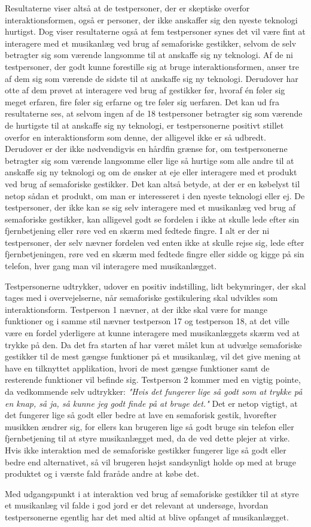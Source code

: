 Resultaterne viser altså at de testpersoner, der er skeptiske overfor interaktionsformen, også er personer, der ikke anskaffer sig den nyeste teknologi hurtigst. Dog viser resultaterne også at fem testpersoner synes det vil være fint at interagere med et musikanlæg ved brug af semaforiske gestikker, selvom de selv betragter sig som værende langsomme til at anskaffe sig ny teknologi. Af de ni testpersoner, der godt kunne forestille sig at bruge interaktionsformen, anser tre af dem sig som værende de sidste til at anskaffe sig ny teknologi. Derudover har otte af dem prøvet at interagere ved brug af gestikker før, hvoraf én føler sig meget erfaren, fire føler sig erfarne og tre føler sig uerfaren. Det kan ud fra resultaterne ses, at selvom ingen af de 18 testpersoner betragter sig som værende de hurtigste til at anskaffe sig ny teknologi, er testpersonerne positivt stillet overfor en interaktionsform som denne, der alligevel ikke er så udbredt. Derudover er der ikke nødvendigvis en hårdfin grænse for, om testpersonerne betragter sig som værende langsomme eller lige så hurtige som alle andre til at anskaffe sig ny teknologi og om de ønsker at eje eller interagere med et produkt ved brug af semaforiske gestikker. Det kan altså betyde, at der er en købelyst til netop sådan et produkt, om man er interesseret i den nyeste teknologi eller ej. De testpersoner, der ikke kan se sig selv interagere med et musikanlæg ved brug af semaforiske gestikker, kan alligevel godt se fordelen i ikke at skulle lede efter sin fjernbetjening eller røre ved en skærm med fedtede fingre. I alt er der ni testpersoner, der selv nævner fordelen ved enten ikke at skulle rejse sig, lede efter fjernbetjeningen, røre ved en skærm med fedtede fingre eller sidde og kigge på sin telefon, hver gang man vil interagere med musikanlægget. \blankline
 
Testpersonerne udtrykker, udover en positiv indstilling, lidt bekymringer, der skal tages med i overvejelserne, når semaforiske gestikulering skal udvikles som interaktionsform. Testperson 1 nævner, at der ikke skal være for mange funktioner og i samme stil nævner testperson 17 og testperson 18, at det ville være en fordel yderligere at kunne interagere med musikanlæggets skærm ved at trykke på den. Da det fra starten af har været målet kun at udvælge semaforiske gestikker til de mest gængse funktioner på et musikanlæg, vil det give mening at have en tilknyttet applikation, hvori de mest gængse funktioner samt de resterende funktioner vil befinde sig. Testperson 2 kommer med en vigtig pointe, da vedkommende selv udtrykker: \textsl{"Hvis det fungerer lige så godt som at trykke på en knap, så ja, så kunne jeg godt finde på at bruge det."} Det er netop vigtigt, at det fungerer lige så godt eller bedre at lave en semaforisk gestik, hvorefter musikken ændrer sig, for ellers kan brugeren lige så godt bruge sin telefon eller fjernbetjening til at styre musikanlægget med, da de ved dette plejer at virke. Hvis ikke interaktion med de semaforiske gestikker fungerer lige så godt eller bedre end alternativet, så vil brugeren højst sandsynligt holde op med at bruge produktet og i værste fald fraråde andre at købe det.

Med udgangspunkt i at interaktion ved brug af semaforiske gestikker til at styre et musikanlæg vil falde i god jord er det relevant at undersøge, hvordan testpersonerne egentlig har det med altid at blive opfanget af musikanlægget.

